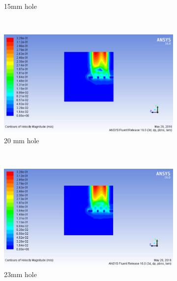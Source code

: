 \begin{figure}[h]
\begin{subfigure}[b]{0.5\textwidth}
 		\caption{15mm hole}
 		\label{fig:structured}
 	\end{subfigure}%
 	~ %
 	\begin{subfigure}[b]{0.5\textwidth}
 		\includegraphics[width=\textwidth]{136.jpg}
 		\caption{20 mm hole}
 		\label{fig:unstructured}
 	\end{subfigure}
 	~ %
 	\begin{subfigure}[b]{0.5\textwidth}
 		\includegraphics[width=\textwidth]{137.jpg}
 		\caption{23mm hole}
 		\label{fig:structured}
 	\end{subfigure}%
 	~ %
 	\begin{subfigure}[b]{0.5\textwidth}

\end{subfigure}
\end{figure}
